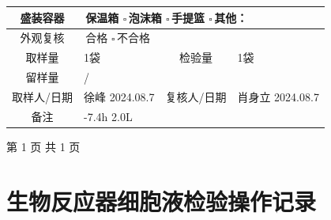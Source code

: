 \documentclass[UTF8,10pt,a4paper,fontset=fandol]{ctexart}
\newcommand{\fieldvalue}[1]{#1}
\newcommand{\handwritten}[1]{#1}
\begin{document}
\begin{tabular}{|c|p{4.0cm}|c|p{3.5cm}|}
盛装容器 &
\multicolumn{3}{l|}{
\fieldvalue{\checkmark\,保温箱}
\quad $\square$\,泡沫箱
\quad $\square$\,手提篮
\quad $\square$\,其他：\underline{\hspace{1.2cm}}}
\\ \hline

外观复核 &
\multicolumn{3}{l|}{
\fieldvalue{\checkmark\,合格}
\quad $\square$\,不合格}
\\ \hline

取样量 &
\fieldvalue{1袋} &
检验量 &
\fieldvalue{1袋}
\\ \hline

留样量 &
\fieldvalue{/} &
\multicolumn{2}{c|}{}
\\ \hline

取样人/日期 &
\fieldvalue{\handwritten{徐峰}}
\quad
\fieldvalue{\handwritten{2024.08.7}} &
复核人/日期 &
\fieldvalue{\handwritten{肖身立}}
\quad
\fieldvalue{\handwritten{2024.08.7}}
\\ \hline

备注 &
\multicolumn{3}{l|}{
\fieldvalue{\handwritten{-7.4h}}
\qquad
\fieldvalue{\handwritten{2.0L}}}
\\ \hline
\end{tabular}

\vfill
\begin{center}
第 1 页 共 1 页
\end{center}

\newpage

\section*{生物反应器细胞液检验操作记录}
\end{document}
